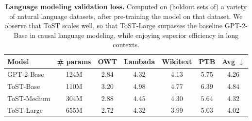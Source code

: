 \documentclass[../../book-main.tex]{subfiles}
\begin{document}
\begin{table}[t]
\centering
\begin{tabular}{@{}lcccccc@{}}
\toprule
Model & \# params & OWT & Lambada & Wikitext & PTB & Avg $\downarrow$
\\ \midrule
GPT-2-Base & 124M & 2.84 & 4.32 & 4.13 & 5.75 & 4.26 \\
ToST-Base & 110M & 3.20 & 4.98 & 4.77 & 6.39 & 4.84 \\
ToST-Medium & 304M & 2.88 & 4.45 & 4.30 & 5.64 & 4.32 \\
ToST-Large & 655M & 2.72 & 4.32 & 3.99 & 5.03 & 4.02 \\ \bottomrule
\end{tabular}%
\caption{\small\textbf{Language 
modeling validation loss.} Computed on
(holdout sets of) a variety of natural language datasets, after
pre-training the model on that dataset. We observe that ToST scales
well, so that ToST-Large surpasses the baseline GPT-2-Base in causal
language modeling, while enjoying superior efficiency in long contexts.}
\label{tab:tost_lm}
\end{table}
\end{document}
